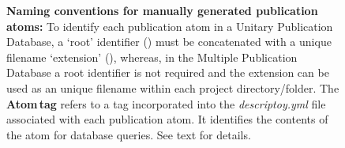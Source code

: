 \documentclass[12pt]{article}
\begin{document}
\begin{figure}[h]
\caption{{\bf Naming conventions for manually generated publication atoms:} To identify each publication atom in a Unitary Publication Database, a `root' identifier ({\color{Red}{red}}) must be concatenated with a unique filename `extension' ({\color{Green}{green}}), whereas, in the Multiple Publication Database a root identifier is not required and the extension can be used as an unique filename within each project directory/folder. The {\bf Atom\,tag} refers to a tag incorporated into the {\it descriptoy.yml} file associated with each publication atom. It identifies the contents of the atom for database queries. See text for details.}
  \label{fig:po-1}
\end{figure}



\end{document}

